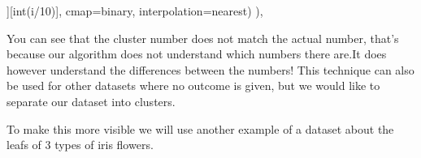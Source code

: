 \documentclass[letterpaper,10pt,english]{jupyterBook}
\begin{document}
\begin{sphinxVerbatim}[commandchars=\\\{\}]
      
                         \PYG{p}{[}\PYG{p}{]} \PYG{p}{[}\PYG{p}{]}
                          

    
    \PYG{p}{[}][int(i/10)], cmap=\PYGZsq{}binary\PYGZsq{}, interpolation=\PYGZsq{}nearest\PYGZsq{})
      ),
             
\end{sphinxVerbatim}

\noindent{}

\sphinxAtStartPar
You can see that the cluster number does not match the actual number, that’s because our algorithm does not understand which numbers there are.It does however understand the differences between the numbers!
This technique can also be used for other datasets where no outcome is given, but we would like to separate our dataset into clusters.

\sphinxAtStartPar
To make this more visible we will use another example of a dataset about the leafs of 3 types of iris flowers.

\begin{sphinxVerbatim}[commandchars=\\\{\}]
  
\end{sphinxVerbatim}
\end{document}
